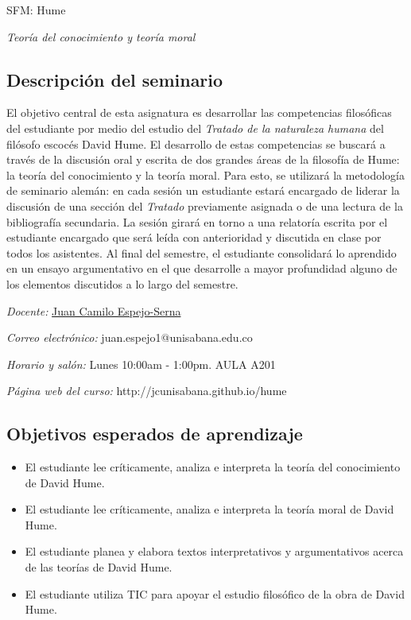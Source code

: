 \documentclass[]{article}
\begin{document}
{ \huge SFM: Hume}\label{seminario-de-filosofuxeda-moderna-hume}

{ \large \emph{Teoría del conocimiento y teoría moral}}
\subsection{Descripción del
seminario}\label{descripciuxf3n-del-seminario}

El objetivo central de esta asignatura es desarrollar las competencias
filosóficas del estudiante por medio del estudio del \emph{Tratado de la
naturaleza humana} del filósofo escocés David Hume. El desarrollo de
estas competencias se buscará a través de la discusión oral y escrita de
dos grandes áreas de la filosofía de Hume: la teoría del conocimiento y
la teoría moral. Para esto, se utilizará la metodología de seminario
alemán: en cada sesión un estudiante estará encargado de liderar la
discusión de una sección del \emph{Tratado} previamente asignada o de
una lectura de la bibliografía secundaria. La sesión girará en torno a
una relatoría escrita por el estudiante encargado que será leída con
anterioridad y discutida en clase por todos los asistentes. Al final del
semestre, el estudiante consolidará lo aprendido en un ensayo
argumentativo en el que desarrolle a mayor profundidad alguno de los
elementos discutidos a lo largo del
semestre.

\emph{Docente:} \href{}{Juan Camilo Espejo-Serna}

\emph{Correo electrónico:} juan.espejo1@unisabana.edu.co

\emph{Horario y salón:} Lunes 10:00am - 1:00pm. AULA A201

\emph{Página web del curso:} http://jcunisabana.github.io/hume

\subsection{Objetivos esperados de
aprendizaje}\label{objetivos-esperados-de-aprendizaje}

\begin{itemize}
\item
  El estudiante lee críticamente, analiza e interpreta la teoría del
  conocimiento de David Hume.
\item
  El estudiante lee críticamente, analiza e interpreta la teoría moral
  de David Hume.
\item
  El estudiante planea y elabora textos interpretativos y argumentativos
  acerca de las teorías de David Hume.
\item
  El estudiante utiliza TIC para apoyar el estudio filosófico de la obra
  de David Hume.
\end{itemize}
\end{document}
